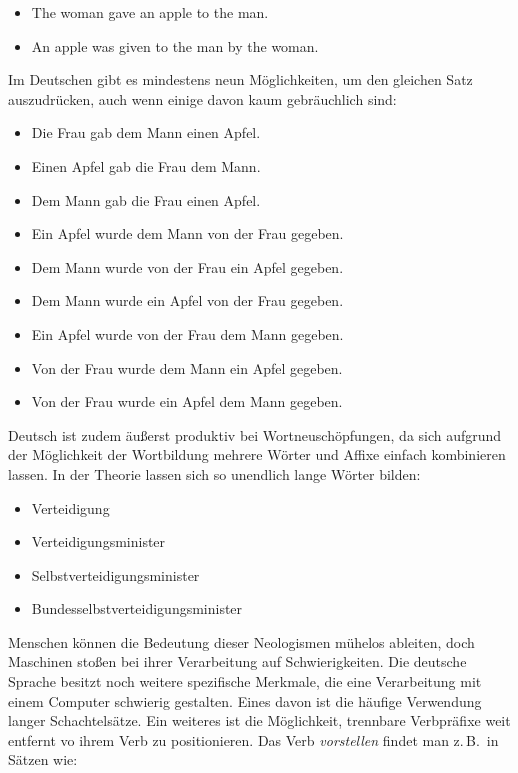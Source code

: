 \documentclass[]{../../metanetpaper}
\begin{document}
\begin{multicols}{2}
\begin{itemize}
\item The woman gave an apple to the man.
\item An apple was given to the man by the woman.
\end{itemize}

Im Deutschen gibt es mindestens neun Möglichkeiten, um den gleichen Satz auszudrücken, auch wenn einige davon kaum gebräuchlich sind:

\begin{itemize}
\item Die Frau gab dem Mann einen Apfel.
\item Einen Apfel gab die Frau dem Mann.
\item Dem Mann gab die Frau einen Apfel.
\item Ein Apfel wurde dem Mann von der Frau gegeben.
\item Dem Mann wurde von der Frau ein Apfel gegeben.
\item Dem Mann wurde ein Apfel von der Frau gegeben.
\item Ein Apfel wurde von der Frau dem Mann gegeben.
\item Von der Frau wurde dem Mann ein Apfel gegeben.
\item Von der Frau wurde ein Apfel dem Mann gegeben.
\end{itemize}  

Deutsch ist zudem äußerst produktiv bei Wortneuschöpfungen, da sich aufgrund der Möglichkeit der Wortbildung mehrere Wörter und Affixe einfach kombinieren lassen. In der Theorie lassen sich so unendlich lange Wörter bilden:

\begin{itemize} 
\item Verteidigung 
\item Verteidigungsminister 
\item Selbstverteidigungsminister 
\item Bundesselbstverteidigungsminister 
\end{itemize}
 
Menschen können die Bedeutung dieser Neologismen mühelos ableiten, doch Maschinen stoßen bei ihrer Verarbeitung auf Schwierigkeiten. Die deutsche Sprache besitzt noch weitere spezifische Merkmale, die eine Verarbeitung mit einem Computer schwierig gestalten. Eines davon ist die häufige Verwendung langer Schachtelsätze. Ein weiteres ist die Möglichkeit, trennbare Verbpräfixe weit entfernt vo ihrem Verb zu positionieren. Das Verb \textit{vorstellen} findet man z.\,B.~in Sätzen wie:


\end{multicols}
\end{document}

